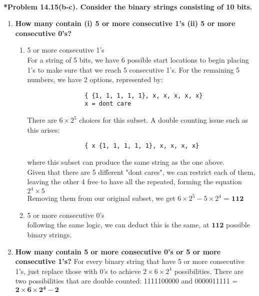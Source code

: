 \documentclass{article}
\begin{document}
    \noindent\\[0.25in]
    \noindent \textbf{*Problem 14.15(b-c). Consider the binary strings consisting of 10 bits.}
    \begin{enumerate}[label=(\alph*)]
        \item \textbf{How many contain (i) 5 or more consecutive 1’s (ii) 5 or more consecutive 0’s?}
        \begin{enumerate}[label=(\roman*)]
            \item 5 or more consecutive 1's
            \\ For a string of 5 bits, we have 6 possible start locations to begin placing 1's to make 
            sure that we reach 5 consecutive 1's. For the remaining 5 numbers, we have 2 options, represented
            by:
            \begin{verbatim}
                { {1, 1, 1, 1, 1}, x, x, x, x, x}
                x = dont care
            \end{verbatim}
            There are $6 \times 2^5$ choices for this subset. A double counting issue such as this arises:
            \begin{verbatim}
                { x {1, 1, 1, 1, 1}, x, x, x, x}
            \end{verbatim}
            where this subset can produce the same string as the one above.\\
            Given that there are 5 different "dont cares", we can restrict each of them, leaving the other 4 free to have all the repeated, forming the equation $2^4 \times 5$\\
            Removing them from our original subset, we get $6 \times 2^5 - 5 \times 2^4$ = {\LARGE $\boxed{\mathbf{112}}$}
            \item 5 or more consecutive 0's
            \\ following the same logic, we can deduct this is the same, at {\LARGE $\boxed{\mathbf{112}}$}
            possible binary strings.
        \end{enumerate}
        \item \textbf{How many contain 5 or more consecutive 0’s or 5 or more consecutive 1’s?}
        For every binary string that have 5 or more consecutive 1's, just replace those with 0's
        to achieve $2 \times 6 \times 2^4$ possibilities. There are two possibilities that are double
        counted: 1111100000 and 0000011111 = {\LARGE $\boxed{\mathbf{2 \times 6 \times 2^4 - 2}}$}
    \end{enumerate}
\end{document}
